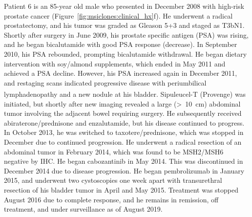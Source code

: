 Patient 6 is an 85-year old male who presented in December 2008 with high-risk prostate cancer (Figure~\ref{fig:msiclones:clinical_hx}f). He underwent a radical prostatectomy, and his tumor was graded as Gleason 5+3 and staged as T3bN1. Shortly after surgery in June 2009, his prostate specific antigen (PSA) was rising, and he began bicalutamide with good PSA response (decrease). In September 2010, his PSA rebounded, prompting bicalutamide withdrawal. He began dietary intervention with soy\slash{}almond supplements, which ended in May 2011 and achieved a PSA decline. However, his PSA increased again in December 2011, and restaging scans indicated progressive disease with periumbilical lymphadenopathy and a new nodule at his bladder. Sipuleucel-T (Provenge\textsuperscript{\textregistered{}}) was initiated, but shortly after new imaging revealed a large (\textgreater{}~10~cm) abdominal tumor involving the adjacent bowel requiring surgery. He subsequently received abiraterone\slash{}prednisone and enzalutamide, but his disease continued to progress. In October 2013, he was switched to taxotere\slash{}prednisone, which was stopped in December due to continued progression. He underwent a radical resection of an abdominal tumor in February 2014, which was found to be MSH2/MSH6 negative by IHC\@. He began cabozantinib in May 2014. This was discontinued in December 2014 due to disease progression. He began pembrolizumab in January 2015, and underwent two cystoscopies one week apart with transurethral resection of his bladder tumor in April and May 2015. Treatment was stopped August 2016 due to complete response, and he remains in remission, off treatment, and under surveillance as of August 2019.

